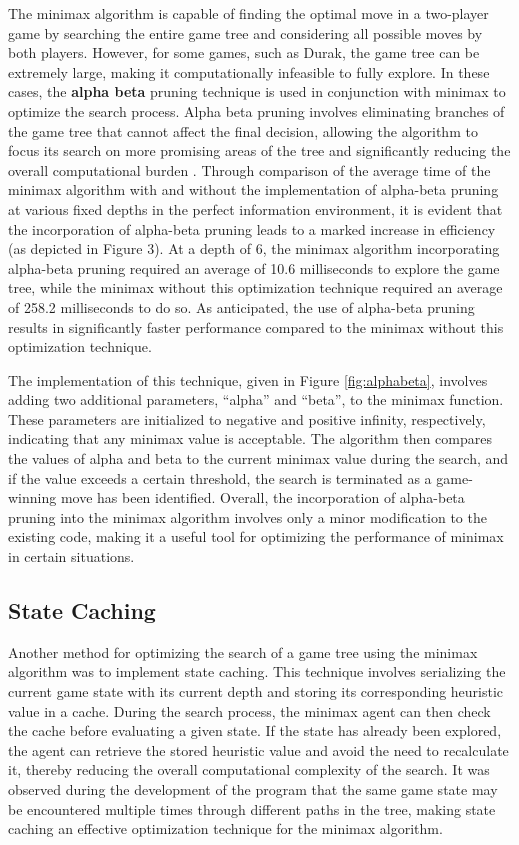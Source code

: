 The minimax algorithm is capable of finding the optimal move in a two-player game by searching the entire game tree and considering all possible moves by both players. However, for some games, such as Durak, the game tree can be extremely large, making it computationally infeasible to fully explore. In these cases, the \textbf{alpha beta} pruning technique is used in conjunction with minimax to optimize the search process. Alpha beta pruning involves eliminating branches of the game tree that cannot affect the final decision, allowing the algorithm to focus its search on more promising areas of the tree and significantly reducing the overall computational burden \citep{AI4Ed}. Through comparison of the average time of the minimax algorithm with and without the implementation of alpha-beta pruning at various fixed depths in the perfect information environment, it is evident that the incorporation of alpha-beta pruning leads to a marked increase in efficiency (as depicted in Figure 3). At a depth of 6, the minimax algorithm incorporating alpha-beta pruning required an average of 10.6 milliseconds to explore the game tree, while the minimax without this optimization technique required an average of 258.2 milliseconds to do so. As anticipated, the use of alpha-beta pruning results in significantly faster performance compared to the minimax without this optimization technique.

The implementation of this technique, given in Figure \ref{fig:alphabeta}, involves adding two additional parameters, ``alpha'' and ``beta'', to the minimax function. These parameters are initialized to negative and positive infinity, respectively, indicating that any minimax value is acceptable. The algorithm then compares the values of alpha and beta to the current minimax value during the search, and if the value exceeds a certain threshold, the search is terminated as a game-winning move has been identified. Overall, the incorporation of alpha-beta pruning into the minimax algorithm involves only a minor modification to the existing code, making it a useful tool for optimizing the performance of minimax in certain situations.

\subsection{State Caching}

Another method for optimizing the search of a game tree using the minimax algorithm was to implement state caching. This technique involves serializing the current game state with its current depth and storing its corresponding heuristic value in a cache. During the search process, the minimax agent can then check the cache before evaluating a given state. If the state has already been explored, the agent can retrieve the stored heuristic value and avoid the need to recalculate it, thereby reducing the overall computational complexity of the search. It was observed during the development of the program that the same game state may be encountered multiple times through different paths in the tree, making state caching an effective optimization technique for the minimax algorithm.

